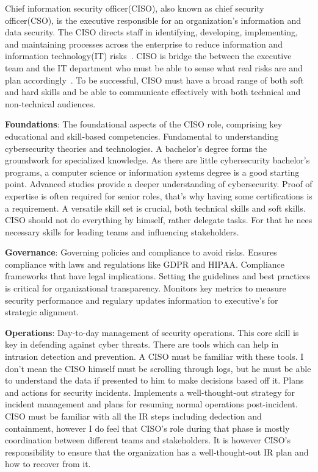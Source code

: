 

Chief information security officer(CISO), also known as chief security officer(CSO), is the executive responsible for an organization's information and data security.
The CISO directs staff in identifying, developing, implementing, and maintaining processes across the enterprise to reduce information
and information technology(IT) risks~\cite[587-588]{HOOPER2016585}. CISO is bridge the between the executive team and the IT department who
must be able to
sense what
real risks are and plan accordingly~\cite[261]{10658980701746577}. To be successful, CISO must have a broad range of both soft and hard
skills and be able to communicate effectively with both technical and non-technical audiences.

\textbf{Foundations}: The foundational aspects of the CISO role, comprising key educational and skill-based competencies.
Fundamental to understanding cybersecurity theories and technologies.
A bachelor's degree forms the groundwork for specialized knowledge. As there are little cybersecurity bachelor's programs, a computer
science or information systems degree is a good starting point. Advanced studies provide a deeper understanding of cybersecurity.
Proof of expertise is often required for senior roles, that's why having some certifications is a requirement.
A versatile skill set is crucial, both technical skills and soft skills. CISO should not do everything by himself, rather delegate tasks.
For that he nees necessary skills for leading teams and influencing stakeholders.

\textbf{Governance}: Governing policies and compliance to avoid risks.
Ensures compliance with laws and regulations like GDPR and HIPAA.
Compliance frameworks that have legal implications.
Setting the guidelines and best practices is critical for organizational transparency.
Monitors key metrics to measure security performance and regulary updates information to executive's for strategic alignment.

\textbf{Operations}: Day-to-day management of security operations.
This core skill is key in defending against cyber threats.
There are tools which can help in intrusion detection and prevention. A CISO must
be familiar with these tools. I don't mean the CISO
himself must be scrolling through logs, but he must be able to understand the data if presented to him to make decisions based off it.
Plans and actions for security incidents. Implements a well-thought-out strategy for incident management and
plans for resuming normal operations post-incident. CISO must be familiar with all the IR steps including dedection and
containment, however I do feel that CISO's role during that phase is mostly coordination between different teams and stakeholders. It is
however CISO's responsibility to ensure that the organization has a well-thought-out IR plan and how to recover from it.

